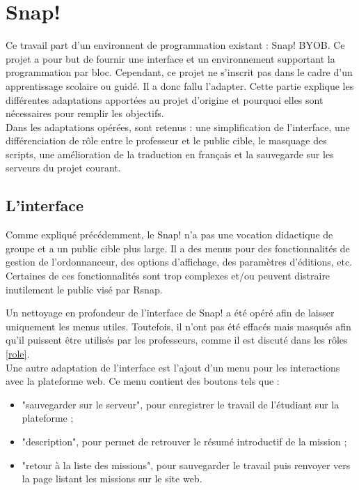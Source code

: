 \section{Snap!}
\label{solution SNAP}
Ce travail part d'un environnent de programmation existant : Snap! BYOB. Ce projet a pour but de fournir une interface et un environnement supportant la programmation par bloc. Cependant, ce projet ne s'inscrit pas dans le cadre d'un apprentissage scolaire ou guidé. Il a donc fallu l'adapter. Cette partie explique les différentes adaptations apportées au projet d'origine et pourquoi elles sont nécessaires pour remplir les objectifs.\\

Dans les adaptations opérées, sont retenus : une simplification de l'interface, une différenciation de rôle entre le professeur et le public cible, le masquage des scripts, une amélioration de la traduction en français et la sauvegarde sur les serveurs du projet courant.

\subsection{L'interface}
\label{interface}
Comme expliqué précédemment, le Snap! n'a pas une vocation didactique de groupe et a un public cible plus large. Il a des menus pour des fonctionnalités de gestion de l'ordonnanceur, des options d'affichage, des paramètres d'éditions, etc. Certaines de ces fonctionnalités sont trop complexes et/ou peuvent distraire inutilement le public visé par \gls{Rsnap}.

Un nettoyage en profondeur de l'interface de Snap! a été opéré afin de laisser uniquement les menus utiles. Toutefois, il n'ont pas été effacés mais masqués afin qu'il puissent être utilisés par les professeurs, comme il est discuté dans les rôles \ref{role}.\\

Une autre adaptation de l'interface est l'ajout d'un menu pour les interactions avec la plateforme web. Ce menu contient des boutons tels que :
\begin{itemize}
  \item "sauvegarder sur le serveur", pour enregistrer le travail de l'étudiant sur la plateforme ;
  \item "description", pour permet de retrouver le résumé introductif de la mission ;
  \item "retour à la liste des missions", pour sauvegarder le travail puis renvoyer vers la page listant les missions sur le site web.
\end{itemize}

